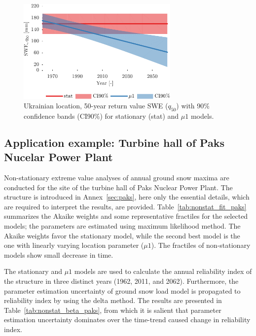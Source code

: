 \begin{figure}[htbp!]
	\centering
	\includegraphics[width=0.7\textwidth]{stat_nonstat_conf_int_time_02.pdf}
	\caption{Ukrainian location, 50-year return value SWE ($q_{50}$) with 90\% confidence bands (CI90\%) for stationary (stat) and $\mu 1$ models.}
	\label{fig:extrap_nonstat}
\end{figure}

\subsection{Application example: Turbine hall of Paks Nucelar Power Plant}
\label{sec:turbine_trend}

Non-stationary extreme value analyses of annual ground snow maxima are conducted for the site of the turbine hall of Paks Nuclear Power Plant. The structure is introduced in Annex~\ref{sec:paks}, here only the essential details, which are required to interpret the results, are provided. Table~\ref{tab:nonstat_fit_paks} summarizes the Akaike weights and some representative fractiles for the selected models; the parameters are estimated using maximum likelihood method. The Akaike weights favor the stationary model, while the second best model is the one with linearly varying location parameter ($\mu1$). The fractiles of non-stationary models show small decrease in time.

The stationary and $\mu1$ models are used to calculate the annual reliability index of the structure in three distinct years (1962, 2011, and 2062). Furthermore, the parameter estimation uncertainty of ground snow load model is propagated to reliability index by using the delta method. The results are presented in Table~\ref{tab:nonstat_beta_paks}, from which it is salient that parameter estimation uncertainty dominates over the time-trend caused change in reliability index.

